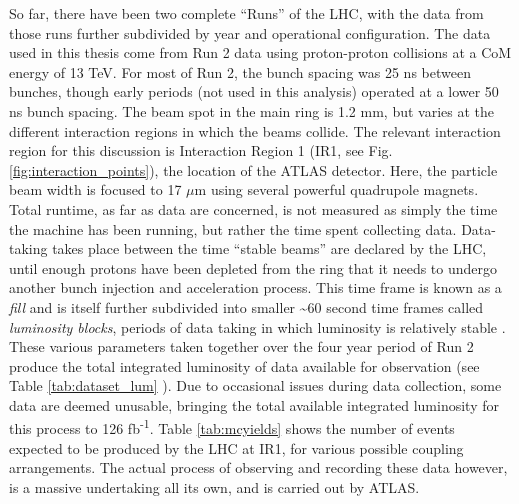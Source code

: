     

    So far, there have been two complete ``Runs'' of the LHC, with the data from those runs further subdivided by year and operational configuration.
    The data used in this thesis come from Run 2 data using proton-proton collisions at a CoM energy of 13 TeV.
    For most of Run 2, the bunch spacing was 25 ns between bunches, though early periods (not used in this analysis) operated at a lower 50 ns bunch spacing.
    The beam spot in the main ring is 1.2 mm, but varies at the different interaction regions in which the beams collide.
    The relevant interaction region for this discussion is Interaction Region 1 (IR1, see Fig. \ref{fig:interaction_points}), the location of the ATLAS detector.
    Here, the particle beam width is focused to 17 $\mu$m\cite{lhc_run2} using several powerful quadrupole magnets.
    Total runtime, as far as data are concerned,
        is not measured as simply the time the machine has been running,
        but rather the time spent collecting data.
    Data-taking takes place between the time ``stable beams'' are declared by the LHC, until enough protons have been depleted from the ring that it needs to undergo another bunch injection and acceleration process.
    This time frame is known as a \textit{fill}
        and is itself further subdivided into smaller \textasciitilde 60 second time frames called \textit{luminosity blocks},
        periods of data taking in which luminosity is relatively stable \cite{data_quality}.
    These various parameters taken together over the four year period of Run 2 produce the total integrated luminosity of data available for observation (see Table \ref{tab:dataset_lum} ).
    Due to occasional issues during data collection, some data are deemed unusable,
        bringing the total available integrated luminosity for this process to 126 fb\textsuperscript{-1}.
    Table \ref{tab:mcyields} shows the number of \vbfhhproc events expected to be produced by the LHC at IR1,
        for various possible coupling arrangements.
    The actual process of observing and recording these data however, is a massive undertaking all its own, and is carried out by ATLAS.
